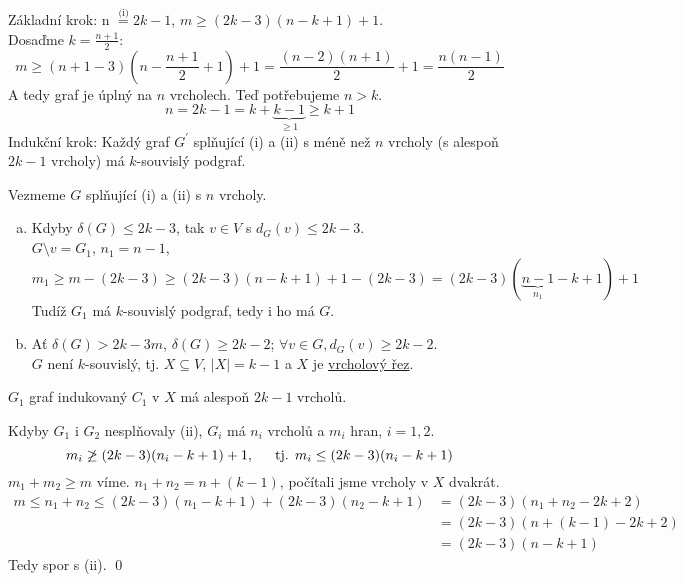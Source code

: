 Základní krok: n $\stackrel{\text{(i)}}{=}2k-1$, $m \geq (2k-3)(n-k+1)+1$.\\
Dosaďme $k = \frac{n+1}{2}$:
\begin{equation}
    m \geq (n+1-3)\left(n-\frac{n+1}{2}+1\right)+1 = \frac{(n-2)(n+1)}{2}+1 = \frac{n(n-1)}{2}
\end{equation}
A tedy graf je úplný na $n$ vrcholech. Teď potřebujeme $n>k$.
\begin{equation}
    n = 2k-1 = k + \underbrace{k-1}_{\geq 1} \geq k+1
\end{equation}
Indukční krok: Každý graf $G^\prime$ splňující (i) a (ii) s méně než $n$ vrcholy (s alespoň $2k-1$ vrcholy) má 
$k$-souvislý podgraf.

Vezmeme $G$ splňující (i) a (ii) s $n$ vrcholy.
\begin{enumerate}[(a)]
    \item Kdyby $\delta(G) \leq 2k-3$, tak $v \in V$ s $d_G(v) \leq 2k-3$.\\
    $G \setminus v = G_1$, $n_1=n-1$,
    \begin{equation*}
        m_1 \geq m-(2k-3) \geq (2k-3)(n-k+1)+1 - (2k-3) = (2k-3)(\underbrace{n-1}_{n_1}-k+1)+1
    \end{equation*}
    Tudíž $G_1$ má $k$-souvislý podgraf, tedy i ho má $G$.
    \item Ať $\delta(G) > 2k-3m$, $\delta(G) \geq 2k-2$; $\forall v \in G, d_G(v)\geq 2k-2$.\\
    $G$ není $k$-souvislý, tj. $X \subseteq V$, $|X|=k-1$ a $X$ je \hyperref[vrchRez]{vrcholový řez}.
\end{enumerate}


$G_1$ graf indukovaný $C_1$ v $X$ má alespoň $2k-1$ vrcholů.

Kdyby $G_1$ i $G_2$ nesplňovaly (ii), $G_i$ má $n_i$ vrcholů a $m_i$ hran, $i=1,2$.
\begin{equation}
    m_i \not\geq (2k-3)(n_i-k+1)+1, \hspace{1.5em} \text{tj. } m_i \leq (2k-3)(n_i-k+1)
\end{equation}
$m_1+m_2 \geq m$ víme. $n_1+n_2 = n+(k-1)$, počítali jsme vrcholy v $X$ dvakrát.
\begin{align*}
    m \leq n_1 + n_2 \leq (2k-3)(n_1-k+1)+(2k-3)(n_2-k+1) &= (2k-3)(n_1+n_2-2k+2) \\
    &= (2k-3)(n+(k-1)-2k+2) \\
    &= (2k-3)(n-k+1)
\end{align*}
Tedy spor s (ii). \hspace{\fill} \qed